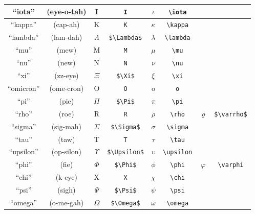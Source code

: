 \documentclass[final,10pt,letterpaper,landscape]{article}
\begin{document}
{\begin{tabular}{c | c || c | c || c | c | c | c}
    \hline
    \hline
    ``iota''    & (eye-o-tah) & I             & \texttt{I}           & $\iota$    & \verb#\iota#    & & \\
    \hline
    \hline
    ``kappa''   & (cap-ah)    & K             & \texttt{K}           & $\kappa$   & \verb#\kappa#   & & \\
    \hline
    \hline
    ``lambda''  & (lam-dah)   & $\Lambda$     & \verb#$\Lambda$#     & $\lambda$  & \verb#\lambda#  & & \\
    \hline
    \hline
    ``mu''      & (mew)       & M             & \texttt{M}           & $\mu$      & \verb#\mu#      & & \\
    \hline
    \hline
    ``nu''      & (new)       & N             & \texttt{N}           & $\nu$      & \verb#\nu#      & & \\
    \hline
    \hline
    ``xi''      & (zz-eye)    & $\Xi$         & \verb#$\Xi$#         & $\xi$      & \verb#\xi#      & & \\
    \hline
    \hline
    ``omicron'' & (ome-cron)  & O             & \texttt{O}           & o          & \texttt{o}      & & \\
    \hline
    \hline
    ``pi''      & (pie)       & $\Pi$         & \verb#$\Pi$#         & $\pi$      & \verb#\pi#      & & \\
    \hline
    \hline
    ``rho''     & (roe)       & R             & \texttt{R}           & $\rho$     & \verb#\rho#     & $\varrho$     & \verb#$\varrho$# \\
    \hline
    \hline
    ``sigma''   & (sig-mah)   & $\Sigma$      & \verb#$\Sigma$#      & $\sigma$   & \verb#\sigma#   & & \\
    \hline
    \hline
    ``tau''     & (taw)       & T             & \texttt{T}           & $\tau$     & \verb#\tau#     & & \\
    \hline
    \hline
    ``upsilon'' & (op-silon)  & $\Upsilon$    & \verb#$\Upsilon$#    & $\upsilon$ & \verb#\upsilon# & & \\
    \hline
    \hline
    ``phi''     & (fie)       & $\Phi$        & \verb#$\Phi$#        & $\phi$     & \verb#\phi#     & $\varphi$     & \verb#\varphi#   \\
    \hline
    \hline
    ``chi''     & (k-eye)     & X             & \texttt{X}           & $\chi$     & \verb#\chi#     & & \\
    \hline
    \hline
    ``psi''     & (sigh)      & $\Psi$        & \verb#$\Psi$#        & $\psi$     & \verb#\psi#     & & \\
    \hline
    \hline
    ``omega''   & (o-me-gah)  & $\Omega$      & \verb#$\Omega$#      & $\omega$   & \verb#\omega#   & &
  \end{tabular}
}
\end{document}

